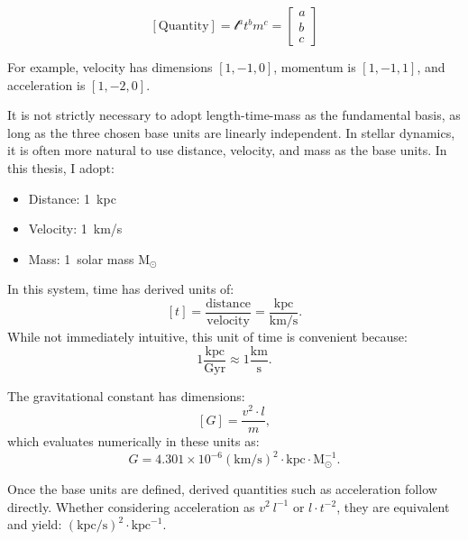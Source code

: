     \begin{equation}
        \left[\mathrm{Quantity}\right] = \mathcal{l}^a t^b m^c =
            \begin{bmatrix}
                a\\
                b\\
                c 
            \end{bmatrix}
    \end{equation}

    For example, velocity has dimensions $[1, -1, 0]$, momentum is $[1, -1, 1]$, and acceleration is $[1, -2, 0]$.

    It is not strictly necessary to adopt length-time-mass as the fundamental basis, as long as the three chosen base units are linearly independent. In stellar dynamics, it is often more natural to use distance, velocity, and mass as the base units. In this thesis, I adopt:
    \begin{itemize}
        \item Distance: 1~kpc
        \item Velocity: 1~km/s 
        \item Mass: 1~solar mass $\mathrm{M}_\odot$
    \end{itemize}

    In this system, time has derived units of:
    \begin{equation}
        \left[t\right] = \frac{\mathrm{distance}}{\mathrm{velocity}} = \frac{\mathrm{kpc}}{\mathrm{km/s}}.
    \end{equation}
    While not immediately intuitive, this unit of time is convenient because:
    \begin{equation}
        1\frac{\mathrm{kpc}}{\mathrm{Gyr}} \approx 1\frac{\mathrm{km}}{\mathrm{s}}.
    \end{equation}

    The gravitational constant has dimensions:
    \begin{equation}    
        \left[G\right]=\frac{v^2 \cdot l}{m},
    \end{equation} 
    which evaluates numerically in these units as: 
    \begin{equation}
        G = 4.301 \times 10^{-6} \left(\mathrm{km}/\mathrm{s}\right)^2 \cdot \mathrm{kpc} \cdot \mathrm{M}_\odot^{-1}.
    \end{equation}

    Once the base units are defined, derived quantities such as acceleration follow directly. Whether considering acceleration as $v^2~l^{-1}$ or $l \cdot t^{-2}$, they are equivalent and yield: $\left(\mathrm{kpc}/\mathrm{s}\right)^2 \cdot \mathrm{kpc}^{-1}$.

